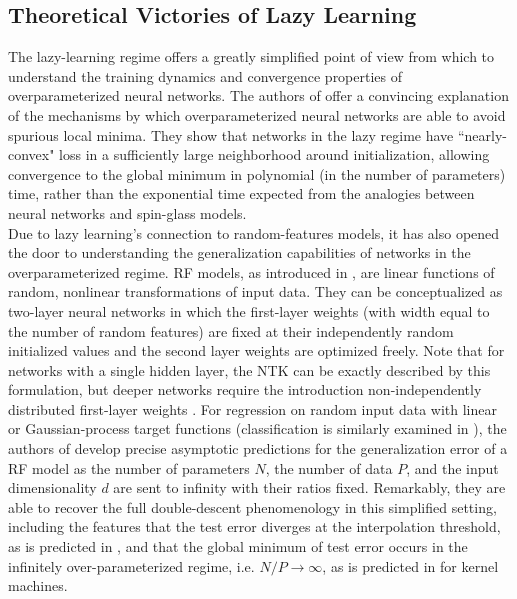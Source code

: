 \documentclass[a4paper, 12pt]{article}
\begin{document}
\subsection{Theoretical Victories of Lazy Learning}

The lazy-learning regime offers a greatly simplified point of view from which to understand the training dynamics and convergence properties of overparameterized neural networks. The authors of \cite{allen-zhuConvergenceTheoryDeep2019} offer a convincing explanation of the mechanisms by which overparameterized neural networks are able to avoid spurious local minima. They show that networks in the lazy regime have ``nearly-convex" loss in a sufficiently large neighborhood around initialization, allowing convergence to the global minimum in polynomial (in the number of parameters) time, rather than the exponential time expected from the analogies between neural networks and spin-glass models.\\

Due to lazy learning's connection to random-features models, it has also opened the door to understanding the generalization capabilities of networks in the overparameterized regime. RF models, as introduced in \cite{rahimiRandomFeaturesLargeScale2008}, are linear functions of random, nonlinear transformations of input data. They can be conceptualized as two-layer neural networks in which the first-layer weights (with width equal to the number of random features) are fixed at their independently random initialized values and the second layer weights are optimized freely. Note that for networks with a single hidden layer, the NTK can be exactly described by this formulation, but deeper networks require the introduction non-independently distributed first-layer weights \cite{chizatLazyTrainingDifferentiable2020}. For regression on random input data with linear or Gaussian-process target functions (classification is similarly examined in \cite{dengModelDoubleDescent2020}), the authors of \cite{meiGeneralizationErrorRandom2019} develop precise asymptotic predictions for the generalization error of a RF model as the number of parameters $N$, the number of data $P$, and the input dimensionality $d$ are sent to infinity with their ratios fixed. Remarkably, they are able to recover the full double-descent phenomenology in this simplified setting, including the features that the test error diverges at the interpolation threshold, as is predicted in \cite{geigerScalingDescriptionGeneralization2019}, and that the global minimum of test error occurs in the infinitely over-parameterized regime, i.e. $N/P\rightarrow\infty$, as is predicted in \cite{belkinReconcilingModernMachine2019,belkinUnderstandDeepLearning2018} for kernel machines.\\
\end{document}
